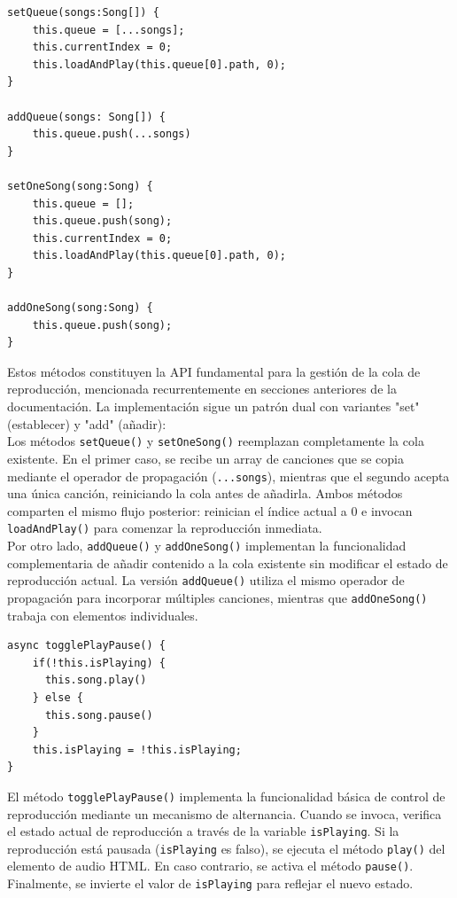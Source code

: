\documentclass[11pt, a4paper]{article}
\begin{document}
                \begin{lstlisting}[caption={set y add}]
setQueue(songs:Song[]) {
    this.queue = [...songs];
    this.currentIndex = 0;
    this.loadAndPlay(this.queue[0].path, 0);
}

addQueue(songs: Song[]) {
    this.queue.push(...songs)
}

setOneSong(song:Song) {
    this.queue = [];
    this.queue.push(song);
    this.currentIndex = 0;
    this.loadAndPlay(this.queue[0].path, 0);
}

addOneSong(song:Song) {
    this.queue.push(song);
}
                \end{lstlisting}

                Estos métodos constituyen la API fundamental para la gestión de la cola de reproducción, mencionada recurrentemente en secciones anteriores de la documentación. La implementación sigue un patrón dual con variantes "set" (establecer) y "add" (añadir): \\

                Los métodos \texttt{setQueue()} y \texttt{setOneSong()} reemplazan completamente la cola existente. En el primer caso, se recibe un array de canciones que se copia mediante el operador de propagación (\texttt{...songs}), mientras que el segundo acepta una única canción, reiniciando la cola antes de añadirla. Ambos métodos comparten el mismo flujo posterior: reinician el índice actual a 0 e invocan \texttt{loadAndPlay()} para comenzar la reproducción inmediata. \\

                Por otro lado, \texttt{addQueue()} y \texttt{addOneSong()} implementan la funcionalidad complementaria de añadir contenido a la cola existente sin modificar el estado de reproducción actual. La versión \texttt{addQueue()} utiliza el mismo operador de propagación para incorporar múltiples canciones, mientras que \texttt{addOneSong()} trabaja con elementos individuales. \\

                \begin{lstlisting}[caption={togglePlayPause()}]
async togglePlayPause() {
    if(!this.isPlaying) {
      this.song.play()
    } else {
      this.song.pause()
    }
    this.isPlaying = !this.isPlaying;
}
                \end{lstlisting}
                 
                El método \texttt{togglePlayPause()} implementa la funcionalidad básica de control de reproducción mediante un mecanismo de alternancia. Cuando se invoca, verifica el estado actual de reproducción a través de la variable \texttt{isPlaying}. Si la reproducción está pausada (\texttt{isPlaying} es falso), se ejecuta el método \texttt{play()} del elemento de audio HTML. En caso contrario, se activa el método \texttt{pause()}. Finalmente, se invierte el valor de \texttt{isPlaying} para reflejar el nuevo estado.
\end{document}
